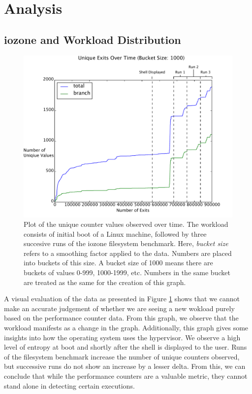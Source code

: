 \documentclass[notitlepage]{article}
\begin{document}
\section{Analysis}

\subsection{iozone and Workload Distribution}
\begin{figure}[htp]
    \centering
    \includegraphics[width=4.5in]{iozone_plot.pdf}
    \caption{Plot of the unique counter values observed over time. The workload
    consists of initial boot of a Linux machine, followed by three succesive
runs of the iozone filesystem benchmark. Here, \textit{bucket size} refers to
a smoothing factor applied to the data. Numbers are placed into buckets of this
size. A bucket size of 1000 means there are buckets of values 0-999, 1000-1999,
etc. Numbers in the same bucket are treated as the same for the creation of this
graph.}
    \label{fig:iozoneplot}
\end{figure}

A visual evaluation of the data as presented in Figure \ref{fig:iozoneplot}
shows that we cannot make an accurate judgement of whether we are seeing a new
wokload purely based on the performance counter data. From this graph, we
observe that the workload manifests as a change in the graph. Additionally, this
graph gives some insights into how the operating system uses the hypervisor. We
observe a high level of entropy at boot and shortly after the shell is displayed
to the user. Runs of the filesystem benchmark increase the number of unique
counters observed, but successive runs do not show an increase by a lesser
delta. From this, we can conclude that while the performance counters are a
valuable metric, they cannot stand alone in detecting certain executions.
\end{document}
